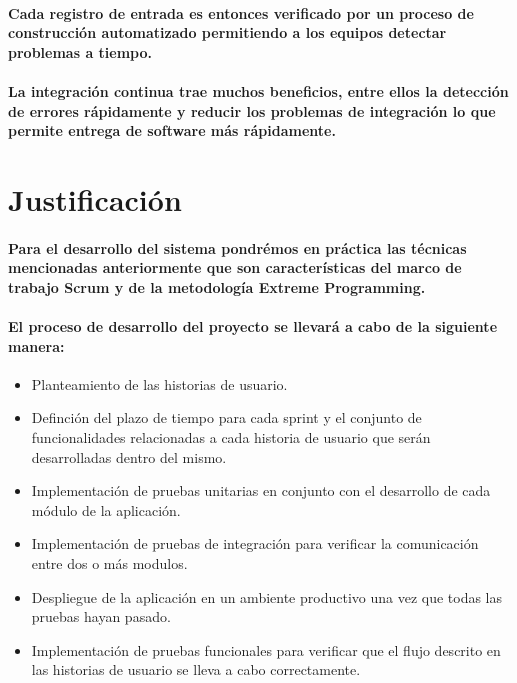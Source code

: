   \paragraph{Cada registro de entrada es entonces verificado por un proceso de construcción automatizado permitiendo a los equipos detectar problemas a tiempo.}
  \paragraph{La integración continua trae muchos beneficios, entre ellos la detección de errores rápidamente y reducir los problemas de integración lo que permite entrega de software más rápidamente.}\cite{27}

\section{Justificación}

  \paragraph{Para el desarrollo del sistema pondrémos en práctica las técnicas mencionadas anteriormente que son características del marco de trabajo Scrum y de la metodología Extreme Programming.}

  \paragraph{El proceso de desarrollo del proyecto se llevará a cabo de la siguiente manera:}

  \begin{itemize}
    \item Planteamiento de las historias de usuario.
    \item Definción del plazo de tiempo para cada sprint y el conjunto de funcionalidades relacionadas a cada historia de usuario que serán desarrolladas dentro del mismo.  
    \item Implementación de pruebas unitarias en conjunto con el desarrollo de cada módulo de la aplicación. 
    \item Implementación de pruebas de integración para verificar la comunicación entre dos o más modulos.
    \item Despliegue de la aplicación en un ambiente productivo una vez que todas las pruebas hayan pasado.
    \item Implementación de pruebas funcionales para verificar que el flujo descrito en las historias de usuario se lleva a cabo correctamente.
  \end{itemize}
